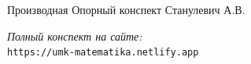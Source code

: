 \documentclass{umk-matematika}
\begin{document}
\maketitlepage
    {Производная}
    {Опорный конспект}
    {Станулевич А.В.}

\begin{center}
\vspace{1.5cm}
\textit{Полный конспект на сайте:}\\
\texttt{https://umk-matematika.netlify.app}
\end{center}
\end{document}
